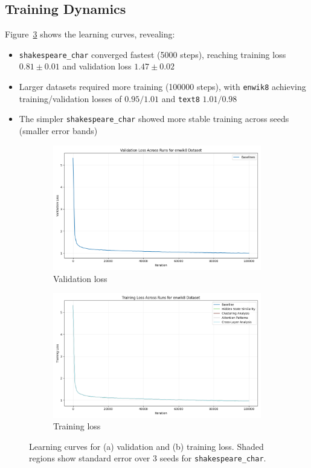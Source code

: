 \documentclass{article} %
\begin{document}
\subsection{Training Dynamics}
Figure~\ref{fig:training_dynamics} shows the learning curves, revealing:
\begin{itemize}
    \item \texttt{shakespeare\_char} converged fastest (5000 steps), reaching training loss $0.81 \pm 0.01$ and validation loss $1.47 \pm 0.02$
    \item Larger datasets required more training (100000 steps), with \texttt{enwik8} achieving training/validation losses of $0.95/1.01$ and \texttt{text8} $1.01/0.98$
    \item The simpler \texttt{shakespeare\_char} showed more stable training across seeds (smaller error bands)
\end{itemize}

\begin{figure}[h]
    \centering
    \begin{subfigure}{0.49\textwidth}
        \includegraphics[width=\textwidth]{val_loss_enwik8.png}
        \caption{Validation loss}
        \label{fig:val_loss}
    \end{subfigure}
    \hfill
    \begin{subfigure}{0.49\textwidth}
        \includegraphics[width=\textwidth]{train_loss_enwik8.png}
        \caption{Training loss}
        \label{fig:train_loss}
    \end{subfigure}
    \caption{Learning curves for (a) validation and (b) training loss. Shaded regions show standard error over 3 seeds for \texttt{shakespeare\_char}.}
    \label{fig:training_dynamics}
\end{figure}
\end{document}
